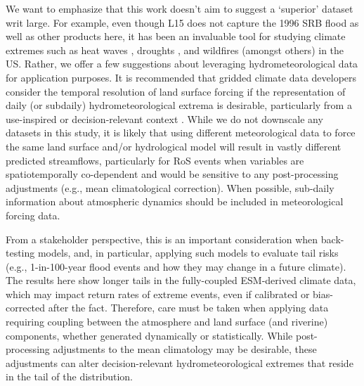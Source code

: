 \documentclass[nhess, manuscript]{copernicus}
\begin{document}
We want to emphasize that this work doesn't aim to suggest a `superior' dataset writ large. For example, even though L15 does not capture the 1996 SRB flood as well as other products here, it has been an invaluable tool for studying climate extremes such as heat waves \citep{mazdiyasni2015substantial}, droughts \citep{pendergrass2020flash,williams2020large}, and wildfires \citep{williams2019observed} (amongst others) in the US.
Rather, we offer a few suggestions about leveraging hydrometeorological data for application purposes.
It is recommended that gridded climate data developers consider the temporal resolution of land surface forcing if the representation of daily (or subdaily) hydrometeorological extrema is desirable, particularly from a use-inspired or decision-relevant context \citep{Jagannathan2021}.
While we do not downscale any datasets in this study, it is likely that using different meteorological data to force the same land surface and/or hydrological model will result in vastly different predicted streamflows, particularly for RoS events when variables are spatiotemporally co-dependent and would be sensitive to any post-processing adjustments (e.g., mean climatological correction). When possible, sub-daily information about atmospheric dynamics should be included in meteorological forcing data.

From a stakeholder perspective, this is an important consideration when back-testing models, and, in particular, applying such models to evaluate tail risks (e.g., 1-in-100-year flood events and how they may change in a future climate).
The results here show longer tails in the fully-coupled ESM-derived climate data, which may impact return rates of extreme events, even if calibrated or bias-corrected after the fact.
Therefore, care must be taken when applying data requiring coupling between the atmosphere and land surface (and riverine) components, whether generated dynamically or statistically.
While post-processing adjustments to the mean climatology may be desirable, these adjustments can alter decision-relevant hydrometeorological extremes that reside in the tail of the distribution.




\end{document}
